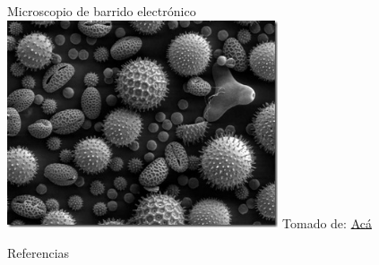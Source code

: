 \documentclass[aspectratio=169]{beamer}
\begin{document}
\begin{frame}{Microscopio de barrido electrónico}
    \centering
    \includegraphics[width=8cm]{fig/Optica/Microscopia.jpg}
     \tiny{Tomado de: \href{https://cienciaexplicada.com/microscopio-electronico-de-barrido.html}{Acá}}
\end{frame}



\begin{frame}{Referencias}

\footnotesize

\end{frame}
\end{document}
